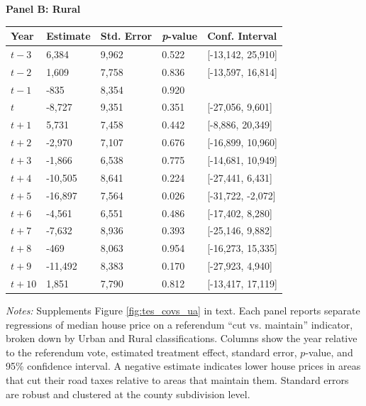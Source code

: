 \begin{table}[htbp]
\begin{threeparttable}
    \centering
    \textbf{Panel B: Rural} \\[4pt]
    \begin{tabularx}{\textwidth}{l*{4}{X}}
    \hline
    \textbf{Year} & \textbf{Estimate} & \textbf{Std. Error} & \textbf{\textit{p}-value} & \textbf{Conf. Interval} \\
    \hline
    $t - 3$  & 6,384  & 9,962  & 0.522 & [-13,142, 25,910] \\
    $t - 2$  & 1,609  & 7,758  & 0.836 & [-13,597, 16,814] \\
    $t - 1$  & -835   & 8,354  & 0.920 &  \\
    $t$  & -8,727 & 9,351  & 0.351 & [-27,056, 9,601] \\
    $t + 1$  & 5,731  & 7,458  & 0.442 & [-8,886, 20,349] \\
    $t + 2$  & -2,970 & 7,107  & 0.676 & [-16,899, 10,960] \\
    $t + 3$  & -1,866 & 6,538  & 0.775 & [-14,681, 10,949] \\
    $t + 4$  & -10,505 & 8,641 & 0.224 & [-27,441, 6,431] \\
    $t + 5$  & -16,897 & 7,564 & 0.026 & [-31,722, -2,072] \\
    $t + 6$  & -4,561 & 6,551  & 0.486 & [-17,402, 8,280] \\
    $t + 7$  & -7,632 & 8,936  & 0.393 & [-25,146, 9,882] \\
    $t + 8$  & -469   & 8,063  & 0.954 & [-16,273, 15,335] \\
    $t + 9$  & -11,492 & 8,383 & 0.170 & [-27,923, 4,940] \\
    $t + 10$ & 1,851  & 7,790  & 0.812 & [-13,417, 17,119] \\
    \hline
    \end{tabularx}

    \begin{tablenotes}[flushleft]
    \small
    \item \textit{Notes:} Supplements Figure \ref{fig:tes_covs_ua} in text. Each panel reports separate regressions of median house price on a referendum “cut vs. maintain” indicator, broken down by Urban and Rural classifications. Columns show the year relative to the referendum vote, estimated treatment effect, standard error, \(p\)-value, and 95\% confidence interval. A negative estimate indicates lower house prices in areas that cut their road taxes relative to areas that maintain them. Standard errors are robust and clustered at the county subdivision level.
    \end{tablenotes}
    \end{threeparttable}
\end{table}

